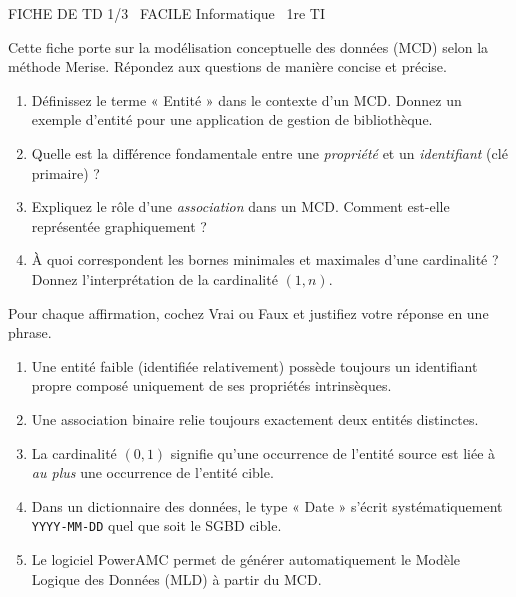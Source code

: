 \documentclass[11pt]{article}
\begin{document}
\begin{tcolorbox}[enhanced,colback=popink,colframe=popink,arc=10pt,boxrule=0pt,left=12pt,right=12pt,top=9pt,bottom=9pt]
{\color{white}\popxbold\small FICHE DE TD 1/3 \textbullet\ FACILE \hfill Informatique \textbullet\ 1re TI\par}
\end{tcolorbox}
\vspace{4pt}
Cette fiche porte sur la modélisation conceptuelle des données (MCD) selon la méthode Merise. Répondez aux questions de manière concise et précise.

\begin{exercice}
\begin{enumerate}
    \item Définissez le terme « Entité » dans le contexte d'un MCD. Donnez un exemple d'entité pour une application de gestion de bibliothèque.
    \item Quelle est la différence fondamentale entre une \textit{propriété} et un \textit{identifiant} (clé primaire) ?
    \item Expliquez le rôle d'une \textit{association} dans un MCD. Comment est-elle représentée graphiquement ?
    \item À quoi correspondent les bornes minimales et maximales d'une cardinalité ? Donnez l'interprétation de la cardinalité $(1, n)$.
\end{enumerate}
\end{exercice}

\begin{exercice}
Pour chaque affirmation, cochez Vrai ou Faux et justifiez votre réponse en une phrase.
\begin{enumerate}
    \item Une entité faible (identifiée relativement) possède toujours un identifiant propre composé uniquement de ses propriétés intrinsèques.
    \item Une association binaire relie toujours exactement deux entités distinctes.
    \item La cardinalité $(0, 1)$ signifie qu'une occurrence de l'entité source est liée à \textit{au plus} une occurrence de l'entité cible.
    \item Dans un dictionnaire des données, le type « Date » s'écrit systématiquement \texttt{YYYY-MM-DD} quel que soit le SGBD cible.
    \item Le logiciel PowerAMC permet de générer automatiquement le Modèle Logique des Données (MLD) à partir du MCD.
\end{enumerate}
\end{exercice}
\end{document}
